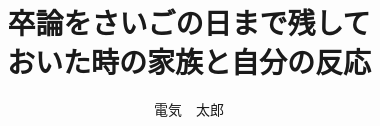\documentclass{ltjsarticle}
\title{卒論をさいごの日まで残して\\おいた時の家族と自分の反応}
\date{\formatdate{8}{2}{2023}} %
\author{電気　太郎}
\begin{document}
\mytitlepage %
\end{document}
